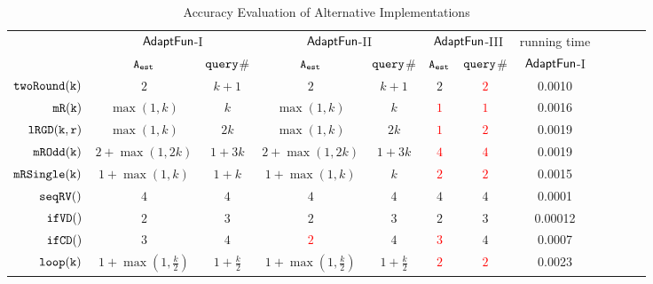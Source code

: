 {\footnotesize
\begin {table}[H]
\vspace{-0.5cm}
    \caption{Accuracy Evaluation of {\THESYSTEM}  Alternative Implementations}
    \vspace{-0.3cm}
        \label{tb:adapt-imp-alternatives}
        \begin{center}
        \centering
{\tiny
        \begin{tabular}{ | >{\tiny}r | c | c | c | c | c | c | c | c | c | c | c |}
        \hline \hline
        \multirow{2}{*}{Program $c$}
         & \multicolumn{2}{c|}{$\textsf{AdaptFun}$-I}
         & \multicolumn{2}{c|}{$\textsf{AdaptFun}$-II}
         & \multicolumn{2}{c|}{$\textsf{AdaptFun}$-III}
         & {running time} \\ 
         \cline{2-8}
         & {${\mathtt{A_{est}}}$ } & {${\tt query}$\# } & {${\mathtt{A_{est}}}$ } & {${\tt query}$\# } & {${\mathtt{A_{est}}}$ } & {${\tt query}$\# } & $\textsf{AdaptFun}$-I \\
         \cline{5-8}
         \hline \hline
         $  \mathtt{twoRound(k)}$ &  $2$    & $k+1 $  & $2$ & $k + 1$ & $2$ & \textcolor{red}{$2$} & 0.0010   \\
         $  \mathtt{mR(k)}$ &   $\max(1,k)$ & $k$  &  $\max(1,k)$ & $k$ & \textcolor{red}{$1$} & \textcolor{red}{$1$} & 0.0016 \\
         $  \mathtt{lRGD(k, r)}$ & $\max(1,k) $ & $ 2k $  &  $\max(1,k) $ & $ 2k $ & \textcolor{red}{$1$} & \textcolor{red}{$2$} & 0.0019   \\
         $  \mathtt{mROdd(k)}$  &  $2+\max(1,2k)  $ & $1 + 3 k $  &  $2+\max(1,2k)  $ & $1 + 3 k $  & \textcolor{red}{$4$} & \textcolor{red}{$4$} & 0.0019 \\
         $  \mathtt{mRSingle(k)}$    & $1+ \max(1, k) $ & $1 + k$  &  $1+ \max(1, k) $ & $k$ & \textcolor{red}{$2$} & \textcolor{red}{$2$} & 0.0015  \\
         $  \mathtt{seqRV()}$   & $4$ &   $4$  & $4$ & $4$ & $4$ & $4$ & 0.0001 \\
         $  \mathtt{ifVD()}$   & $2$ &   $3$  & $2$ & $3$ & $2$ & $3$ & 0.00012 \\
         $  \mathtt{ifCD()}$   & $3$ &   $4$  & \textcolor{red}{$2$} & $4$ & \textcolor{red}{$3$} & $4$ & 0.0007 \\
         $  \mathtt{loop(k)}$ &    $1 + \max(1, \frac{k}{2}) $  &  $1+\frac{k}{2} $ & $1 + \max(1, \frac{k}{2}) $  &  $1+\frac{k}{2} $ & \textcolor{red}{$2$} & \textcolor{red}{$2$} & 0.0023 \\

\end{tabular}}
\end{center}
\end{table}}
